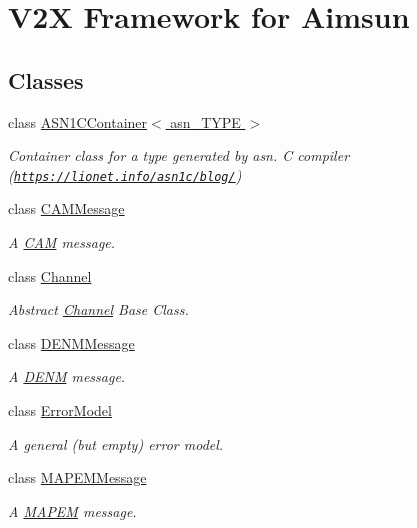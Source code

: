 \hypertarget{group__V2XFramework}{}\section{V2X Framework for Aimsun}
\label{group__V2XFramework}
\subsection*{Classes}
\begin{DoxyCompactItemize}
\item 
class \hyperlink{classASN1CContainer}{A\+S\+N1\+C\+Container$<$ asn\+\_\+\+T\+Y\+P\+E $>$}
\begin{DoxyCompactList}\small\item\em Container class for a type generated by asn. C compiler (\href{https://lionet.info/asn1c/blog/}{\tt https\+://lionet.\+info/asn1c/blog/}) \end{DoxyCompactList}\item 
class \hyperlink{classCAMMessage}{C\+A\+M\+Message}
\begin{DoxyCompactList}\small\item\em A \hyperlink{structCAM}{C\+AM} message. \end{DoxyCompactList}\item 
class \hyperlink{classChannel}{Channel}
\begin{DoxyCompactList}\small\item\em Abstract \hyperlink{classChannel}{Channel} Base Class. \end{DoxyCompactList}\item 
class \hyperlink{classDENMMessage}{D\+E\+N\+M\+Message}
\begin{DoxyCompactList}\small\item\em A \hyperlink{structDENM}{D\+E\+NM} message. \end{DoxyCompactList}\item 
class \hyperlink{classErrorModel}{Error\+Model}
\begin{DoxyCompactList}\small\item\em A general (but empty) error model. \end{DoxyCompactList}\item 
class \hyperlink{classMAPEMMessage}{M\+A\+P\+E\+M\+Message}
\begin{DoxyCompactList}\small\item\em A \hyperlink{structMAPEM}{M\+A\+P\+EM} message. \end{DoxyCompactList}\item 

\end{DoxyCompactItemize}
